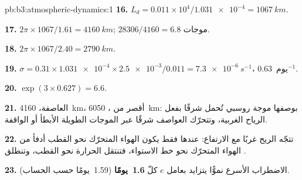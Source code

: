 \begin{solution}{pb:b3:atmospheric-dynamics:1}
\textbf{16.} $L_d = 0.011\times10^4/\num{1.031e-4} = \qty{1067}{km}$.

\textbf{17.} $2\pi\times1067/1.61 = \qty{4160}{km}$; $28306/4160 = 6.8$
موجات.

\textbf{18.} $2\pi\times1067/2.40 = \qty{2790}{km}$.

\textbf{19.} $\sigma = 0.31\times\num{1.031e-4}\times\num{2.5e-3}/0.011 =
\qty{7.3e-6}{s^{-1}}$، \num{0.63}~يوم$^{-1}$.

\textbf{20.} $\exp(3\times0.627) = 6.6$.

\textbf{21.} العاصفة، \qty{4160}{km}، أقصر من
، \qty{6050}{km}: بوصفها موجة روسبي تُحمل شرقًا بفعل
الرياح الغربية، وتتحرّك العواصف شرقًا عبر الموجات الطويلة
الأبطأ أو الواقفة.

\textbf{22.} تتجّه الريح غربًا مع الارتفاع: عندها فقط يكون الهواء المتحرّك نحو القطب
أدفأ من الهواء المتحرّك نحو خط الاستواء، فتنتقل الحرارة نحو القطب، وتنطلق
.

\textbf{23.} الاضطراب الأسرع نموًّا يتزايد بعامل $e$ كلّ
\textbf{\num[text-series-to-math=true]{1.6}~يومًا} (\num{1.59}~يومًا حسب
الحساب).
\end{solution}
